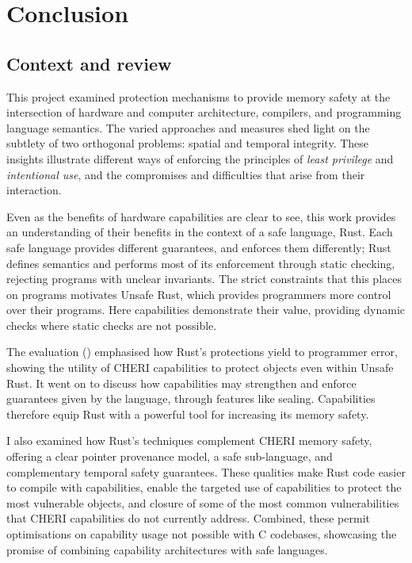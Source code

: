 \documentclass[dissertation.tex]{subfiles}
\begin{document}
\chapter{Conclusion}

\section{Context and review}

This project examined protection mechanisms to provide memory safety at
the intersection of hardware and computer architecture, compilers, and
programming language semantics.
The varied approaches and measures shed light on the subtlety of
two orthogonal problems: spatial and temporal integrity.
These insights illustrate different ways of enforcing the principles of
\emph{least privilege} and \emph{intentional use}, and the compromises
and difficulties that arise from their interaction.

Even as the benefits of hardware capabilities are clear to see, this
work provides an understanding of their benefits in the context of a
safe language, Rust.
Each safe language provides different guarantees, and enforces them
differently; Rust defines semantics and performs most of its enforcement
through static checking, rejecting programs with unclear invariants.
The strict constraints that this places on programs motivates Unsafe
Rust, which provides programmers more control over their programs.
Here capabilities demonstrate their value, providing dynamic checks
where static checks are not possible.

The evaluation () emphasised how Rust's protections
yield to programmer error, showing the utility of CHERI capabilities to
protect objects even within Unsafe Rust.
It went on to discuss how capabilities may strengthen and enforce
guarantees given by the language, through features like sealing.
Capabilities therefore equip Rust with a powerful tool for increasing
its memory safety.

I also examined how Rust's techniques complement CHERI memory safety,
offering a clear pointer provenance model, a safe sub-language, and
complementary temporal safety guarantees.
These qualities make Rust code easier to compile with capabilities,
enable the targeted use of capabilities to protect the most vulnerable
objects, and closure of some of the most common vulnerabilities that
CHERI capabilities do not currently address.
Combined, these permit optimisations on capability usage not possible
with C codebases, showcasing the promise of combining capability
architectures with safe languages.
\end{document}
